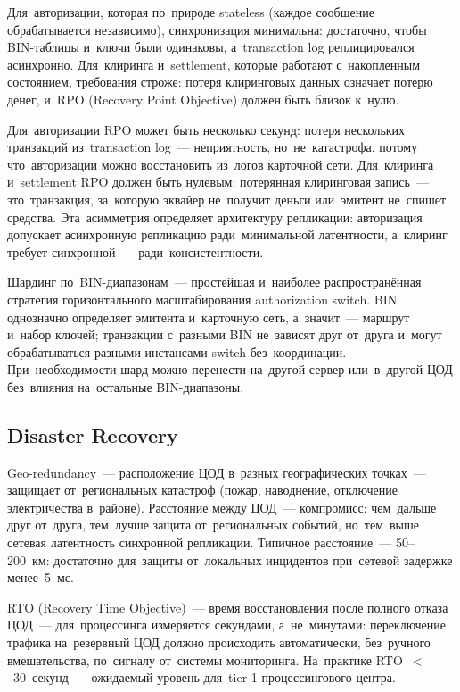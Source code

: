 Для~авторизации, которая по~природе stateless (каждое сообщение
обрабатывается независимо), синхронизация минимальна:
достаточно, чтобы BIN-таблицы и~ключи были одинаковы, а~transaction
log реплицировался асинхронно. Для~клиринга и~settlement,
которые работают с~накопленным состоянием, требования строже:
потеря клиринговых данных означает потерю денег, и~RPO
(Recovery Point Objective) должен быть близок к~нулю.

\begin{important}
  Для~авторизации RPO может быть несколько секунд: потеря
  нескольких транзакций из~transaction log~--- неприятность,
  но~не~катастрофа, потому что~авторизации можно восстановить
  из~логов карточной сети. Для~клиринга и~settlement RPO
  должен быть нулевым: потерянная клиринговая запись~---
  это~транзакция, за~которую эквайер не~получит деньги
  или~эмитент не~спишет средства. Эта~асимметрия определяет
  архитектуру репликации: авторизация допускает асинхронную
  репликацию ради~минимальной латентности, а~клиринг требует
  синхронной~--- ради~консистентности.
\end{important}

\begin{practice}
  Шардинг по~BIN-диапазонам~--- простейшая и~наиболее
  распространённая стратегия горизонтального масштабирования
  authorization switch. BIN однозначно определяет эмитента
  и~карточную сеть, а~значит~--- маршрут и~набор ключей;
  транзакции с~разными BIN не~зависят друг от~друга
  и~могут обрабатываться разными инстансами switch
  без~координации. При~необходимости шард можно перенести
  на~другой сервер или~в~другой ЦОД без~влияния на~остальные
  BIN-диапазоны.
\end{practice}

\subsection*{Disaster Recovery}

Geo-redundancy~--- расположение ЦОД в~разных географических
точках~--- защищает от~региональных катастроф (пожар, наводнение,
отключение электричества в~районе). Расстояние между ЦОД~---
компромисс: чем~дальше друг от~друга, тем~лучше защита
от~региональных событий, но~тем~выше сетевая латентность
синхронной репликации. Типичное расстояние~--- 50--200~км:
достаточно для~защиты от~локальных инцидентов при~сетевой
задержке менее~5~мс.

RTO (Recovery Time Objective)~--- время восстановления после
полного отказа ЦОД~--- для~процессинга измеряется секундами,
а~не~минутами: переключение трафика на~резервный ЦОД должно
происходить автоматически, без~ручного вмешательства,
по~сигналу от~системы мониторинга. На~практике RTO~$<$~30~секунд~---
ожидаемый уровень для~tier-1 процессингового центра.


